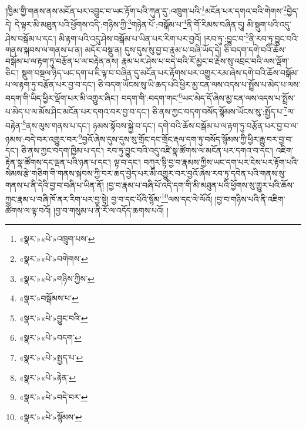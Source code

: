 །ཁྱིམ་གྱི་གནས་ནས་མངོན་པར་འབྱུང་བ་ཡང་རྟོག་པའི་ཀུན་དུ་:འཁྲུག་པའི་\footnote{«སྣར་»«པེ་»འཁྲུག་པས་}མངོན་པར་དགའ་བའི་གེགས་\footnote{«སྣར་»«པེ་»བགེགས་}བྱེད་དེ། དེ་ལྟར་མི་མཐུན་པའི་ཕྱོགས་འདི་:གཉིས་ཀྱི་\footnote{«སྣར་»«པེ་»གཉིས་ཀྱིས་}གཉེན་པོ་:བསྒོམ་པ་\footnote{«སྣར་»བསྒོམས་པ་}ནི་གོ་རིམས་བཞིན་དུ། མི་སྡུག་པའི་འདུ་ཤེས་བསྒོམ་པ་དང་། མི་རྟག་པའི་འདུ་ཤེས་བསྒོམ་པ་ཡིན་པར་རིག་པར་བྱའོ། །རབ་ཏུ་:བྱུང་བ་\footnote{«སྣར་»«པེ་»བྱུང་བའི་}ནི་རབ་ཏུ་བྱུང་བའི་གནས་སྐབས་ལ་གནས་པ་ན། མདོར་བསྡུ་ན། དུས་དུས་སུ་བྱ་བ་རྣམ་པ་བཞི་ཡོད་དེ། ཅི་བདག་དགེ་བའི་ཆོས་བསྒོམ་པ་ལ་རྟག་ཏུ་བརྩོན་པ་ལ་བརྟེན་ནས། རྣམ་པར་ཤེས་པ་བདེ་བའི་རོ་མྱང་བ་རྗེས་སུ་འབྲང་བའི་ལས་ལྡོག་ཅིང་། སྡུག་བསྔལ་ཉིད་ཡང་དག་པ་ཇི་ལྟ་བ་བཞིན་དུ་མངོན་པར་རྟོགས་པར་འགྱུར་རམ་ཞེས་དགེ་བའི་ཆོས་བསྒོམ་པ་ལ་རྟག་ཏུ་བརྩོན་པར་བྱ་བ་དང་། ཅི་བདག་ཡོངས་སུ་ཡི་ཆད་པའི་ཕྱིར་མྱ་ངན་ལས་འདས་པ་སྤྲོས་པ་མེད་པ་ལས་བདག་གི་ཡིད་ཕྱིར་ལྡོག་པར་མི་འགྱུར་ཞིང་། བདག་གི་:བདག་གང་\footnote{«སྣར་»«པེ་»བདག་}ཡང་མེད་དོ་ཞེས་མྱ་ངན་ལས་འདས་པ་སྤྲོས་པ་མེད་པ་ལ་མོས་ཤིང་མངོན་པར་དགའ་བར་བྱ་བ་དང་། ཅི་ནས་ཀྱང་བདག་བསོད་སྙོམས་ཡོངས་སུ་:སྤྱོད་པ་\footnote{«སྣར་»«པེ་»སྤྱད་པ་}ལ་བརྟེན་\footnote{«སྣར་»«པེ་»རྟེན་}ནས་ལུས་གནས་པ་དང་། ཉམས་སྟོབས་སྐྱེ་བ་དང་། དགེ་བའི་ཆོས་བསྒོམ་པ་ལ་རྟག་ཏུ་བརྩོན་པར་བྱ་བ་ལ་ཉམས་:བདེ་བར་འགྱུར་བར་\footnote{«སྣར་»«པེ་»བདེ་བར་}བྱའོ་ཞེས་དུས་དུས་སུ་གྲོང་དང་གྲོང་རྡལ་དག་ཏུ་བསོད་སྙོམས་ཀྱི་ཕྱིར་རྒྱུ་བར་བྱ་བ་དང་། ཅི་ནས་ཀྱང་བདག་ཁྱིམ་པ་དང་། རབ་ཏུ་བྱུང་བའི་འདུ་འཛི་སྣ་ཚོགས་ལ་མངོན་པར་དགའ་བ་དང་། འཇིག་རྟེན་སྣ་ཚོགས་དང་ལྡན་པའི་ཉན་པ་དང་། ལྟ་བ་དང་། བཀུར་སྟི་བྱ་བ་རྣམས་ཀྱིས་ཡང་དག་པར་ངེས་པར་རྟོག་པའི་སེམས་རྩེ་གཅིག་གི་གནས་སྐབས་ཀྱི་བར་ཆད་བྱེད་པར་མི་འགྱུར་བར་བྱའོ་ཞེས་རབ་ཏུ་དབེན་པའི་གནས་སུ་གནས་པ་ནི་དེའི་བྱ་བ་བཞི་པ་ཡིན་ནོ། །བྱ་བ་རྣམ་པ་བཞི་པོ་འདི་དག་གི་མི་མཐུན་པའི་ཕྱོགས་སུ་གྱུར་པའི་ཆོས་ཀྱང་རྣམ་པ་བཞི་ཁོ་ནར་རིག་པར་བྱ་སྟེ། བྱ་བ་དང་པོའི་སྙོམ་\footnote{«སྣར་»«པེ་»སྙོམས་}ལས་དང་ལེ་ལོའོ། །བྱ་བ་གཉིས་པའི་ནི་འཇིག་ཚོགས་ལ་ལྟ་བའོ། །བྱ་བ་གསུམ་པ་ནི་རོ་ལ་འདོད་ཆགས་པའོ། །
